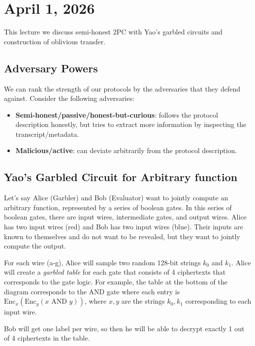 \section{April 1, 2026}
\label{20260401}

This lecture we discuss semi-honest 2PC with Yao's garbled circuits and construction of oblivious transfer.

\subsection{Adversary Powers}
We can rank the strength of our protocols by the adversaries that they defend against. Consider the following adversaries:
\begin{itemize}
    \item \textbf{Semi-honest/passive/honest-but-curious}: follows the protocol description honestly, but tries to extract more information by inspecting the transcript/metadata.
    \item \textbf{Malicious/active}: can deviate arbitrarily from the protocol description.
\end{itemize}

\subsection{Yao's Garbled Circuit for Arbitrary function}

Let's say Alice (Garbler) and Bob (Evaluator) want to jointly compute an arbitrary function, represented by a series of boolean gates. In this series of boolean gates, there are input wires, intermediate gates, and output wires. Alice has two input wires (red) and Bob has two input wires (blue). Their inputs are known to themselves and do not want to be revealed, but they want to jointly compute the output.


For each wire (a-g), Alice will sample two random 128-bit strings $k_0$ and $k_1$. Alice will create a \textit{garbled table} for each gate that consists of 4 ciphertexts that corresponds to the gate logic. For example, the table at the bottom of the diagram corresponds to the AND gate where each entry is $\text{Enc}_x (\text{Enc}_y(x \text{ AND } y))$, where $x,y$ are the strings $k_0, k_1$ corresponding to each input wire.

Bob will get one label per wire, so then he will be able to decrypt exactly 1 out of 4 ciphertexts in the table.

